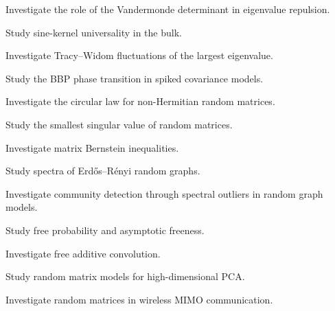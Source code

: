 \begin{exercise}[4]
Investigate the role of the Vandermonde determinant in eigenvalue
repulsion.
\end{exercise}

\begin{exercise}[4]
Study sine-kernel universality in the bulk.
\end{exercise}

\begin{exercise}[4]
Investigate Tracy--Widom fluctuations of the largest eigenvalue.
\end{exercise}

\begin{exercise}[4]
Study the BBP phase transition in spiked covariance models.
\end{exercise}

\begin{exercise}[4]
Investigate the circular law for non-Hermitian random matrices.
\end{exercise}

\begin{exercise}[4]
Study the smallest singular value of random matrices.
\end{exercise}

\begin{exercise}[4]
Investigate matrix Bernstein inequalities.
\end{exercise}

\begin{exercise}[4]
Study spectra of Erd\H{o}s--R\'enyi random graphs.
\end{exercise}

\begin{exercise}[4]
Investigate community detection through spectral outliers in random
graph models.
\end{exercise}

\begin{exercise}[4]
Study free probability and asymptotic freeness.
\end{exercise}

\begin{exercise}[4]
Investigate free additive convolution.
\end{exercise}

\begin{exercise}[4]
Study random matrix models for high-dimensional PCA.
\end{exercise}

\begin{exercise}[4]
Investigate random matrices in wireless MIMO communication.
\end{exercise}


